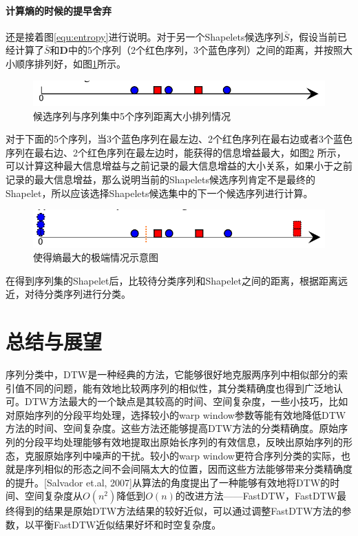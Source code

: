 \subsubsection{计算熵的时候的提早舍弃}
还是接着图\ref{equ:entropy}进行说明。对于另一个Shapelets候选序列$\bar{S}$，假设当前已经计算了$\bar{S}$和$\bm{D}$中的5个序列（2个红色序列，3个蓝色序列）之间的距离，并按照大小顺序排列好，如图\ref{fig:16}所示。
\begin{figure}[h]
  \centering
  \includegraphics[width=0.6\linewidth]{./figure/Entropy2.PNG}
  \caption{候选序列与序列集中5个序列距离大小排列情况}\label{fig:16}
\end{figure}

对于下面的5个序列，当3个蓝色序列在最左边、2个红色序列在最右边或者3个蓝色序列在最右边、2个红色序列在最左边时，能获得的信息增益最大，如图\ref{fig:17} 所示，可以计算这种最大信息增益与之前记录的最大信息增益的大小关系，如果小于之前记录的最大信息增益，那么说明当前的Shapelets候选序列肯定不是最终的Shapelet，所以应该选择Shapelets候选集中的下一个候选序列进行计算。

\begin{figure}[h]
  \centering
  \includegraphics[width=0.6\linewidth]{./figure/Entropy3.PNG}
  \caption{使得熵最大的极端情况示意图}\label{fig:17}
\end{figure}

在得到序列集的Shapelet后，比较待分类序列和Shapelet之间的距离，根据距离远近，对待分类序列进行分类。

\chapter{总结与展望}
序列分类中，DTW是一种经典的方法，它能够很好地克服两序列中相似部分的索引值不同的问题，能有效地比较两序列的相似性，其分类精确度也得到广泛地认可。DTW方法最大的一个缺点是其较高的时间、空间复杂度，一些小技巧，比如对原始序列的分段平均处理\cite{Keogh2000}，选择较小的warp window参数等能有效地降低DTW方法的时间、空间复杂度。这些方法还能够提高DTW方法的分类精确度。原始序列的分段平均处理能够有效地提取出原始长序列的有效信息，反映出原始序列的形态，克服原始序列中噪声的干扰。较小的warp window更符合序列分类的实际，也就是序列相似的形态之间不会间隔太大的位置，因而这些方法能够带来分类精确度的提升。[Salvador et.al, 2007]从算法的角度提出了一种能够有效地将DTW的时间、空间复杂度从$O(n^2)$降低到$O(n)$的改进方法——FastDTW，FastDTW最终得到的结果是原始DTW方法结果的较好近似，可以通过调整FastDTW方法的参数，以平衡FastDTW近似结果好坏和时空复杂度。

